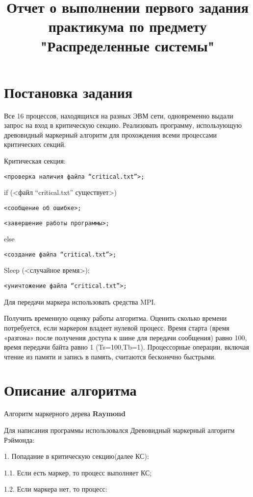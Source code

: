 \documentclass[12pt, oneside, a4paper]{article}
\begin{document}
\title{Отчет о выполнении первого задания практикума по предмету "Распределенные системы"}

\section{Постановка задания}

Все 16 процессов, находящихся на разных ЭВМ сети, одновременно выдали запрос на вход в критическую секцию. Реализовать программу, использующую древовидный маркерный алгоритм для прохождения всеми процессами критических секций.


Критическая секция:

\texttt{<проверка наличия файла “critical.txt”>;}

if (<файл “critical.txt” существует>) {

\texttt{<сообщение об ошибке>;}

\texttt{<завершение работы программы>;}

} else {

\texttt{<создание файла “critical.txt”>;}

Sleep (<случайное время>);

\texttt{<уничтожение файла “critical.txt”>;}

}


Для передачи маркера использовать средства MPI.


Получить временную оценку работы алгоритма. Оценить сколько времени потребуется, если маркером владеет нулевой процесс. Время старта (время «разгона» после получения доступа к шине для передачи сообщения) равно 100, время передачи байта равно 1 (Ts=100,Tb=1). Процессорные операции, включая чтение из памяти и запись в память, считаются бесконечно быстрыми.

\section{Описание алгоритма}

Алгоритм маркерного дерева \textbf{Raymond}

Для написания программы использовался Древовидный маркерный алгоритм Рэймонда:

1. Попадание в критическую секцию(далее КС):

1.1. Если есть маркер, то процесс выполняет КС;

1.2. Если маркера нет, то процесс:
\end{document}
